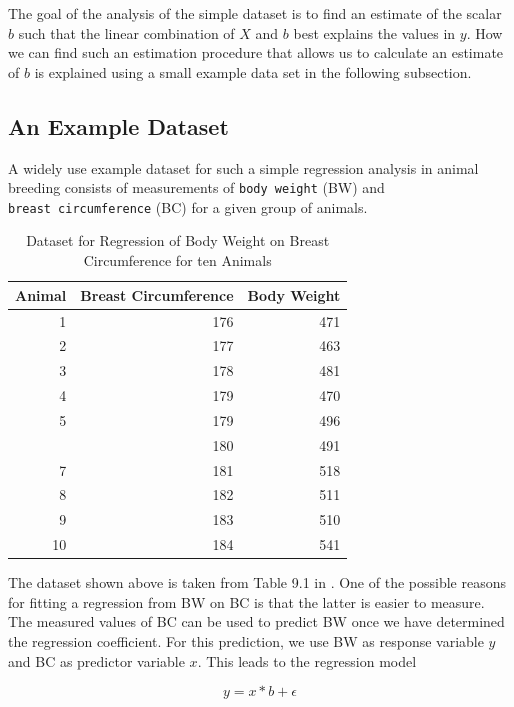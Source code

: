 \documentclass[]{book}
\theoremstyle{definition}
\theoremstyle{definition}
\theoremstyle{definition}
\theoremstyle{remark}
\begin{document}
The goal of the analysis of the simple dataset is to find an estimate of the scalar \(b\) such that the linear combination of \(X\) and \(b\) best explains the values in \(y\). How we can find such an estimation procedure that allows us to calculate an estimate of \(b\) is explained using a small example data set in the following subsection.

\hypertarget{asm-flem-regression-example}{%
\subsection{An Example Dataset}\label{asm-flem-regression-example}}

A widely use example dataset for such a simple regression analysis in animal breeding consists of measurements of \texttt{body\ weight} (BW) and \texttt{breast\ circumference} (BC) for a given group of animals.

\begin{longtable}[t]{rrr}
\caption{\label{tab:dataregression}Dataset for Regression of Body Weight on Breast Circumference for ten Animals}\\
\toprule
Animal & Breast Circumference & Body Weight\\
\midrule
1 & 176 & 471\\
2 & 177 & 463\\
3 & 178 & 481\\
4 & 179 & 470\\
5 & 179 & 496\\
\addlinespace
6 & 180 & 491\\
7 & 181 & 518\\
8 & 182 & 511\\
9 & 183 & 510\\
10 & 184 & 541\\
\bottomrule
\end{longtable}

The dataset shown above is taken from Table 9.1 in \citep{Essl1987}. One of the possible reasons for fitting a regression from BW on BC is that the latter is easier to measure. The measured values of BC can be used to predict BW once we have determined the regression coefficient. For this prediction, we use BW as response variable \(y\) and BC as predictor variable \(x\). This leads to the regression model

\begin{equation}
  y = x * b + \epsilon
  \label{eq:regressionbwonbc}
\end{equation}
\end{document}
